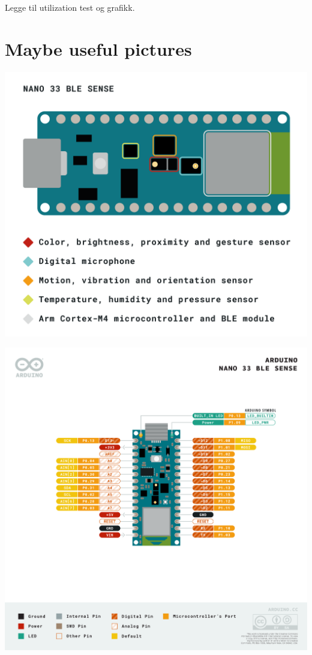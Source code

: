 \documentclass{article}
\begin{document}
Legge til utilization test og grafikk.

\section{Maybe useful pictures}

\includegraphics[width=\linewidth]{img/NANO-33-BLE-Sense_sensor-indentification.png}

\includegraphics[width=\linewidth]{img/Pinout-NANOsense_latest.png}
\end{document}
